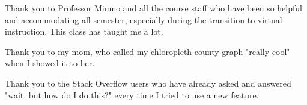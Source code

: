 \documentclass[11pt]{article}
\begin{document}
Thank you to Professor Mimno and all the course staff who have been so
helpful and accommodating all semester, especially during the transition
to virtual instruction. This class has taught me a lot.

Thank you to my mom, who called my chloropleth county graph "really
cool" when I showed it to her.

Thank you to the Stack Overflow users who have already asked and
answered "wait, but how do I do this?" every time I tried to use a new
feature.


    
    
    
    
\end{document}

